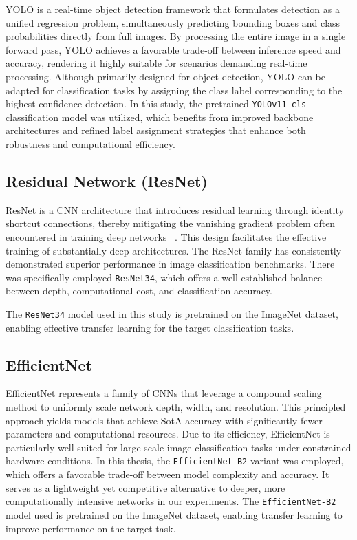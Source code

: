 \ac{YOLO} is a real-time object detection framework that formulates detection as a unified regression problem,
simultaneously predicting bounding boxes and class probabilities directly from full images. By processing the entire
image in a single forward pass, \ac{YOLO} achieves a favorable trade-off between inference speed and accuracy,
rendering it highly suitable for scenarios demanding real-time processing. Although primarily designed for object
detection, \ac{YOLO} can be adapted for classification tasks by assigning the class label corresponding to the
highest-confidence detection. In this study, the pretrained \texttt{YOLOv11-cls} classification model was utilized,
which benefits from improved backbone architectures and refined label assignment strategies that enhance both
robustness and computational efficiency.

\subsection{Residual Network (ResNet)}

\ac{ResNet} is a \ac{CNN} architecture that introduces residual learning through identity
shortcut connections, thereby mitigating the vanishing gradient problem often encountered in training deep networks
~\parencite{he2015deepresiduallearningimage}. This design facilitates the effective training of substantially deep
architectures. The \ac{ResNet} family has consistently demonstrated superior performance in image classification
benchmarks. There was specifically employed \texttt{ResNet34}, which offers a well-established balance between
depth, computational cost, and classification accuracy.

The \texttt{ResNet34} model used in this study is pretrained on the ImageNet dataset, enabling effective transfer
learning for the target classification tasks.

\subsection{EfficientNet}

EfficientNet represents a family of \ac{CNN}s that leverage a compound scaling method to
uniformly scale network depth, width, and resolution. This principled approach yields models that achieve
\ac{SotA} accuracy with significantly fewer parameters and computational resources. Due to its efficiency,
EfficientNet is particularly well-suited for large-scale image classification tasks under constrained hardware
conditions. In this thesis, the \texttt{EfficientNet-B2} variant was employed, which offers a favorable trade-off between
model complexity and accuracy. It serves as a lightweight yet competitive alternative to deeper, more
computationally intensive networks in our experiments. The \texttt{EfficientNet-B2} model used is pretrained on the
ImageNet dataset, enabling transfer learning to improve performance on the target task.

